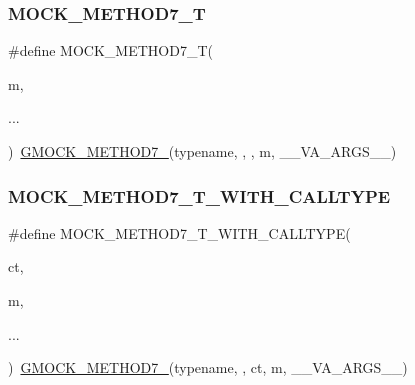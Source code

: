 \mbox{\label{_obj__test_2lib_2googletest-master_2googlemock_2include_2gmock_2gmock-generated-function-mockers_8h_a31bdd1d1448052f4122ecebf937a8f44}} 
\subsubsection{\texorpdfstring{MOCK\_METHOD7\_T}{MOCK\_METHOD7\_T}}
{\footnotesize\ttfamily \#define M\+O\+C\+K\+\_\+\+M\+E\+T\+H\+O\+D7\+\_\+T(\begin{DoxyParamCaption}\item[{}]{m,  }\item[{}]{... }\end{DoxyParamCaption})~\mbox{\hyperlink{_obj__test_2lib_2googletest-release-1_88_81_2googlemock_2include_2gmock_2gmock-generated-function-mockers_8h_ab98a8399ba62b53b375c2807f4d39d2f}{G\+M\+O\+C\+K\+\_\+\+M\+E\+T\+H\+O\+D7\+\_\+}}(typename, , , m, \+\_\+\+\_\+\+V\+A\+\_\+\+A\+R\+G\+S\+\_\+\+\_\+)}

\mbox{\label{_obj__test_2lib_2googletest-master_2googlemock_2include_2gmock_2gmock-generated-function-mockers_8h_ae820565d836fda34401e8bdcfaaa7605}} 
\subsubsection{\texorpdfstring{MOCK\_METHOD7\_T\_WITH\_CALLTYPE}{MOCK\_METHOD7\_T\_WITH\_CALLTYPE}}
{\footnotesize\ttfamily \#define M\+O\+C\+K\+\_\+\+M\+E\+T\+H\+O\+D7\+\_\+\+T\+\_\+\+W\+I\+T\+H\+\_\+\+C\+A\+L\+L\+T\+Y\+PE(\begin{DoxyParamCaption}\item[{}]{ct,  }\item[{}]{m,  }\item[{}]{... }\end{DoxyParamCaption})~\mbox{\hyperlink{_obj__test_2lib_2googletest-release-1_88_81_2googlemock_2include_2gmock_2gmock-generated-function-mockers_8h_ab98a8399ba62b53b375c2807f4d39d2f}{G\+M\+O\+C\+K\+\_\+\+M\+E\+T\+H\+O\+D7\+\_\+}}(typename, , ct, m, \+\_\+\+\_\+\+V\+A\+\_\+\+A\+R\+G\+S\+\_\+\+\_\+)}

